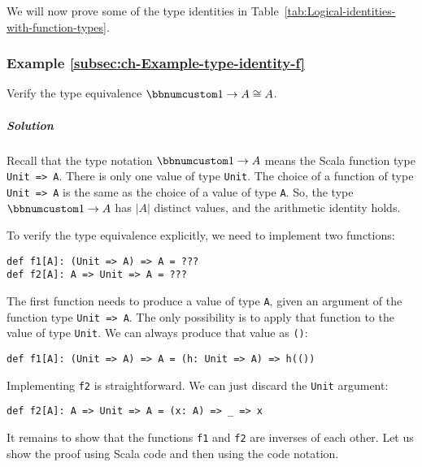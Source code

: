 We will now prove some of the type identities in Table~\ref{tab:Logical-identities-with-function-types}.

\subsubsection{Example \label{subsec:ch-Example-type-identity-f}\ref{subsec:ch-Example-type-identity-f}}

Verify the type equivalence $\bbnum 1\rightarrow A\cong A$.

\subparagraph{Solution}

Recall that the type notation $\bbnum 1\rightarrow A$ means the Scala
function type \lstinline!Unit => A!. There is only one value of type
\lstinline!Unit!. The choice of a function of type \lstinline!Unit => A!
is the same as the choice of a value of type \lstinline!A!. So, the
type $\bbnum 1\rightarrow A$ has $\left|A\right|$ distinct values,
and the arithmetic identity holds.

To verify the type equivalence explicitly, we need to implement two
functions:
\begin{lstlisting}
def f1[A]: (Unit => A) => A = ???
def f2[A]: A => Unit => A = ???
\end{lstlisting}
The first function needs to produce a value of type \lstinline!A!,
given an argument of the function type \lstinline!Unit => A!. The
only possibility is to apply that function to the value of type \lstinline!Unit!.
We can always produce that value as \lstinline!()!:
\begin{lstlisting}
def f1[A]: (Unit => A) => A = (h: Unit => A) => h(())
\end{lstlisting}
Implementing \lstinline!f2! is straightforward. We can just discard
the \lstinline!Unit! argument:
\begin{lstlisting}
def f2[A]: A => Unit => A = (x: A) => _ => x
\end{lstlisting}
It remains to show that the functions \lstinline!f1! and \lstinline!f2!
are inverses of each other. Let us show the proof using Scala code
and then using the code notation.


